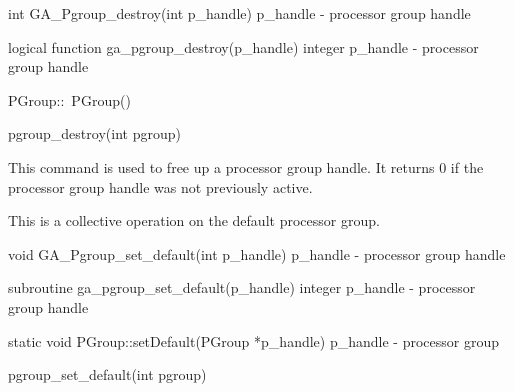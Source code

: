\documentclass[12pt]{article}
\begin{document}

\begin{capi}
int GA_Pgroup_destroy(int p_handle)
   p_handle               - processor group handle                        \access{[input]} 
\end{capi}

\begin{fapi}
logical function ga_pgroup_destroy(p_handle)
   integer      p_handle          - processor group handle                \access{[input]} 
\end{fapi}

\begin{cxxapi}
PGroup::~PGroup()
\end{cxxapi}

\begin{pyapi}
pgroup_destroy(int pgroup)
\end{pyapi}

\begin{desc}

  This command is used to free up a processor group handle. It returns
  0 if the processor group handle was not previously active.

  This is a collective operation on the default processor group.

\end{desc}


\begin{capi}
void GA_Pgroup_set_default(int p_handle)
   p_handle               - processor group handle                        \access{[input]} 
\end{capi}

\begin{fapi}
subroutine ga_pgroup_set_default(p_handle)
   integer     p_handle           - processor group handle                \access{[input]} 
\end{fapi}

\begin{cxxapi}
static void PGroup::setDefault(PGroup *p_handle)
  p_handle                - processor group                               \access{[input]}
\end{cxxapi}

\begin{pyapi}
pgroup_set_default(int pgroup)
\end{pyapi}
\end{document}
